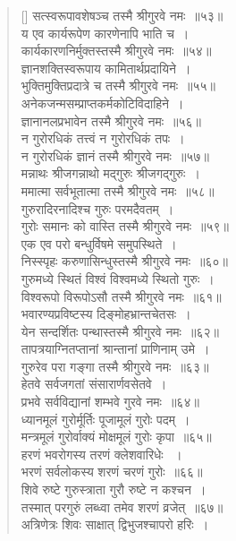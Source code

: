 \documentclass[twoside,12pt,notitlepage]{book}
\begin{document}
\begin{verse}[\versewidth]
सत्स्वरूपावशेषञ्च तस्मै श्रीगुरवे नमः~॥५३॥\\
य एव कार्यरूपेण कारणेनापि भाति च~।\\[-6pt]
कार्यकारणनिर्मुक्तस्तस्मै श्रीगुरवे नमः~॥५४॥\\
ज्ञानशक्तिस्वरूपाय कामितार्थप्रदायिने~।\\[-6pt]
भुक्तिमुक्तिप्रदात्रे च तस्मै श्रीगुरवे नमः~॥५५॥\\
अनेकजन्मसम्प्राप्तकर्मकोटिविदाहिने~।\\[-6pt]
ज्ञानानलप्रभावेन तस्मै श्रीगुरवे नमः~॥५६॥\\
न गुरोरधिकं तत्त्वं न गुरोरधिकं तपः~।\\[-6pt]
न गुरोरधिकं ज्ञानं तस्मै श्रीगुरवे नमः~॥५७॥\\
मन्नाथः श्रीजगन्नाथो मद्गुरुः श्रीजगद्गुरुः~।\\[-6pt]
ममात्मा सर्वभूतात्मा तस्मै श्रीगुरवे नमः~॥५८॥\\
गुरुरादिरनादिश्च गुरुः परमदैवतम्~।\\[-6pt]
गुरोः समानः को वास्ति तस्मै श्रीगुरवे नमः~॥५९॥\\
एक एव परो बन्धुर्विषमे समुपस्थिते~।\\[-6pt]
निस्स्पृहः करुणासिन्धुस्तस्मै श्रीगुरवे नमः~॥६०॥\\
गुरुमध्ये स्थितं विश्वं विश्वमध्ये स्थितो गुरुः~।\\[-6pt]
विश्वरूपो विरूपोऽसौ तस्मै श्रीगुरवे नमः~॥६१॥\\
भवारण्यप्रविष्टस्य दिङ्‍मोहभ्रान्तचेतसः~।\\[-6pt]
येन सन्दर्शितः पन्थास्तस्मै श्रीगुरवे नमः~॥६२॥\\
तापत्रयाग्नितप्तानां श्रान्तानां प्राणिनाम् उमे~।\\[-6pt]
गुरुरेव परा गङ्गा तस्मै श्रीगुरवे नमः~॥६३॥\\
हेतवे सर्वजगतां संसारार्णवसेतवे~।\\[-6pt]
प्रभवे सर्वविद्यानां शम्भवे गुरवे नमः~॥६४॥\\
ध्यानमूलं गुरोर्मूर्तिः पूजामूलं गुरोः पदम्~।\\[-6pt]
मन्त्रमूलं गुरोर्वाक्यं मोक्षमूलं गुरोः कृपा~॥६५॥\\
हरणं भवरोगस्य तरणं क्लेशवारिधेः ~।\\[-6pt]
भरणं सर्वलोकस्य शरणं चरणं गुरोः~॥६६॥\\
शिवे रुष्टे गुरुस्त्राता गुरौ रुष्टे न कश्चन~।\\[-6pt]
तस्मात् परगुरुं लब्ध्वा तमेव शरणं व्रजेत्~॥६७॥\\
अत्रिणेत्रः शिवः साक्षात् द्विभुजश्चापरो हरिः~।\\[-6pt]

\end{verse}
\end{document}

